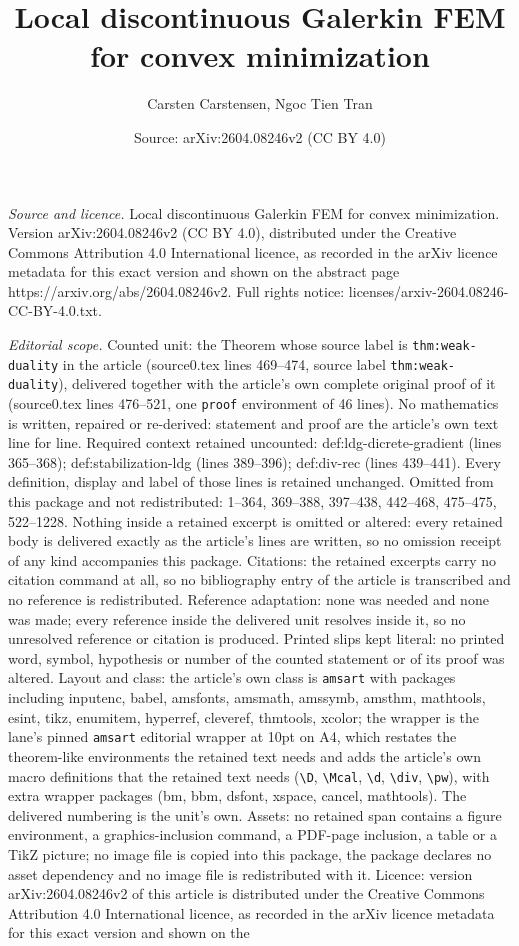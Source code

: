 \documentclass[10pt,a4paper]{amsart}
\title[Local discontinuous Galerkin FEM for convex minimization]{Local discontinuous Galerkin FEM for convex minimization}
\author{Carsten Carstensen, Ngoc Tien Tran}
\date{Source: arXiv:2604.08246v2 (CC BY 4.0)}
\begin{document}
\maketitle

\noindent\emph{Source and licence.} Local discontinuous Galerkin FEM for convex minimization. Version arXiv:2604.08246v2 (CC BY 4.0), distributed under the Creative Commons Attribution 4.0 International licence, as recorded in the arXiv licence metadata for this exact version and shown on the abstract page https://arxiv.org/abs/2604.08246v2. Full rights notice: licenses/arxiv-2604.08246-CC-BY-4.0.txt.\par\smallskip

\noindent\textit{Editorial scope.} Counted unit: the Theorem whose source label is \texttt{thm:weak-duality} in the article (source0.tex lines 469--474, source label \texttt{thm:weak-duality}), delivered together with the article's own complete original proof of it (source0.tex lines 476--521, one \texttt{proof} environment of 46 lines). No mathematics is written, repaired or re-derived: statement and proof are the article's own text line for line. Required context retained uncounted: def:ldg-dicrete-gradient (lines 365--368); def:stabilization-ldg (lines 389--396); def:div-rec (lines 439--441). Every definition, display and label of those lines is retained unchanged. Omitted from this package and not redistributed: 1--364, 369--388, 397--438, 442--468, 475--475, 522--1228. Nothing inside a retained excerpt is omitted or altered: every retained body is delivered exactly as the article's lines are written, so no omission receipt of any kind accompanies this package. Citations: the retained excerpts carry no citation command at all, so no bibliography entry of the article is transcribed and no reference is redistributed. Reference adaptation: none was needed and none was made; every reference inside the delivered unit resolves inside it, so no unresolved reference or citation is produced. Printed slips kept literal: no printed word, symbol, hypothesis or number of the counted statement or of its proof was altered. Layout and class: the article's own class is \texttt{amsart} with packages including inputenc, babel, amsfonts, amsmath, amssymb, amsthm, mathtools, esint, tikz, enumitem, hyperref, cleveref, thmtools, xcolor; the wrapper is the lane's pinned \texttt{amsart} editorial wrapper at 10pt on A4, which restates the theorem-like environments the retained text needs and adds the article's own macro definitions that the retained text needs (\texttt{\textbackslash D}, \texttt{\textbackslash Mcal}, \texttt{\textbackslash d}, \texttt{\textbackslash div}, \texttt{\textbackslash pw}), with extra wrapper packages (bm, bbm, dsfont, xspace, cancel, mathtools). The delivered numbering is the unit's own. Assets: no retained span contains a figure environment, a graphics-inclusion command, a PDF-page inclusion, a table or a TikZ picture; no image file is copied into this package, the package declares no asset dependency and no image file is redistributed with it. Licence: version arXiv:2604.08246v2 of this article is distributed under the Creative Commons Attribution 4.0 International licence, as recorded in the arXiv licence metadata for this exact version and shown on the 
\end{document}
